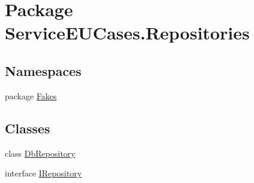 \hypertarget{namespace_service_e_u_cases_1_1_repositories}{\section{Package Service\-E\-U\-Cases.\-Repositories}
\label{namespace_service_e_u_cases_1_1_repositories}
}
\subsection*{Namespaces}
\begin{DoxyCompactItemize}
\item 
package \hyperlink{namespace_service_e_u_cases_1_1_repositories_1_1_fakes}{Fakes}
\end{DoxyCompactItemize}
\subsection*{Classes}
\begin{DoxyCompactItemize}
\item 
class \hyperlink{class_service_e_u_cases_1_1_repositories_1_1_db_repository}{Db\-Repository}
\item 
interface \hyperlink{interface_service_e_u_cases_1_1_repositories_1_1_i_repository}{I\-Repository}
\end{DoxyCompactItemize}

